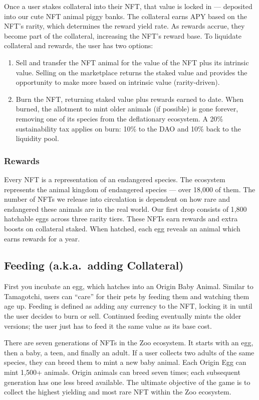Once a user stakes collateral into their NFT, that value is locked in --- deposited into our cute NFT animal piggy banks. The collateral earns APY based on the NFT's rarity, which determines the reward yield rate. As rewards accrue, they become part of the collateral, increasing the NFT's reward base. To liquidate collateral and rewards, the user has two options:
\begin{enumerate}[label=(\alph*)]
  \item Sell and transfer the NFT animal for the value of the NFT plus its intrinsic value. Selling on the marketplace returns the staked value and provides the opportunity to make more based on intrinsic value (rarity-driven).
  \item Burn the NFT, returning staked value plus rewards earned to date. When burned, the allotment to mint older animals (if possible) is gone forever, removing one of its species from the deflationary ecosystem. A 20\% sustainability tax applies on burn: 10\% to the DAO and 10\% back to the liquidity pool.
\end{enumerate}

\subsubsection{Rewards}

Every NFT is a representation of an endangered species. The ecosystem represents the animal kingdom of endangered species --- over 18{,}000 of them. The number of NFTs we release into circulation is dependent on how rare and endangered these animals are in the real world. Our first drop consists of 1{,}800 hatchable eggs across three rarity tiers. These NFTs earn rewards and extra boosts on collateral staked. When hatched, each egg reveals an animal which earns rewards for a year.

\subsection{Feeding (a.k.a.\ adding Collateral)}

First you incubate an egg, which hatches into an Origin Baby Animal. Similar to Tamagotchi, users can ``care'' for their pets by feeding them and watching them age up. Feeding is defined as adding any currency to the NFT, locking it in until the user decides to burn or sell. Continued feeding eventually mints the older versions; the user just has to feed it the same value as its base cost.

There are seven generations of NFTs in the Zoo ecosystem. It starts with an egg, then a baby, a teen, and finally an adult. If a user collects two adults of the same species, they can breed them to mint a new baby animal. Each Origin Egg can mint 1{,}500+ animals. Origin animals can breed seven times; each subsequent generation has one less breed available. The ultimate objective of the game is to collect the highest yielding and most rare NFT within the Zoo ecosystem.

